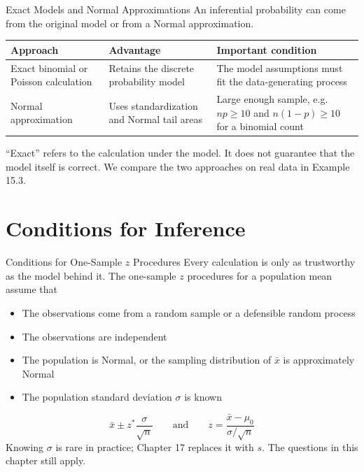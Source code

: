 \documentclass[aspectratio=169]{beamer}
\begin{document}
\begin{frame}{Exact Models and Normal Approximations}
An inferential probability can come from the original model or from a Normal approximation.

\begin{center}
\begin{tabularx}{0.94\textwidth}{>{\RaggedRight\arraybackslash}p{} X X}
\toprule
\textbf{Approach} & \textbf{Advantage} & \textbf{Important condition} \\
\midrule
Exact binomial or Poisson calculation & Retains the discrete probability model & The model assumptions must fit the data-generating process \\
Normal approximation & Uses standardization and Normal tail areas & Large enough sample, e.g.\ $np\ge10$ and $n(1-p)\ge10$ for a binomial count \\
\bottomrule
\end{tabularx}
\end{center}

\vspace{0.2cm}
``Exact'' refers to the calculation under the model. It does not guarantee that the model itself is correct. We compare the two approaches on real data in Example 15.3.
\end{frame}

\section{Conditions for Inference}

\begin{frame}{Conditions for One-Sample $z$ Procedures}
Every calculation is only as trustworthy as the model behind it. The one-sample $z$ procedures for a population mean assume that
\begin{itemize}
  \item The observations come from a random sample or a defensible random process
  \item The observations are independent
  \item The population is Normal, or the sampling distribution of $\bar{x}$ is approximately Normal
  \item The population standard deviation $\sigma$ is known
\end{itemize}
$$\bar{x}\pm z^*\frac{\sigma}{\sqrt{n}} \qquad\text{and}\qquad z=\frac{\bar{x}-\mu_0}{\sigma/\sqrt{n}}$$
Knowing $\sigma$ is rare in practice; Chapter 17 replaces it with $s$. The questions in this chapter still apply.
\end{frame}
\end{document}
